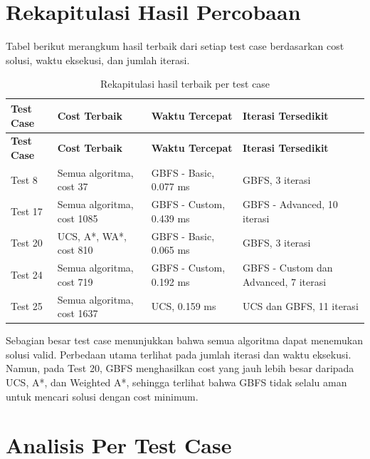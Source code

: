 \section{Rekapitulasi Hasil Percobaan}

Tabel berikut merangkum hasil terbaik dari setiap test case berdasarkan cost solusi, waktu eksekusi, dan jumlah iterasi.

\begin{longtable}{|p{2cm}|p{3.2cm}|p{3.2cm}|p{3.2cm}|}
	\caption{Rekapitulasi hasil terbaik per test case} \\
	\hline
	\rowcolor{green!15}
	\textbf{Test Case} & \textbf{Cost Terbaik} & \textbf{Waktu Tercepat} & \textbf{Iterasi Tersedikit} \\
	\hline
	\endfirsthead
	
	\hline
	\rowcolor{green!15}
	\textbf{Test Case} & \textbf{Cost Terbaik} & \textbf{Waktu Tercepat} & \textbf{Iterasi Tersedikit} \\
	\hline
	\endhead
	
	Test 8 & Semua algoritma, cost 37 & GBFS - Basic, 0.077 ms & GBFS, 3 iterasi \\
	\hline
	Test 17 & Semua algoritma, cost 1085 & GBFS - Custom, 0.439 ms & GBFS - Advanced, 10 iterasi \\
	\hline
	Test 20 & UCS, A*, WA*, cost 810 & GBFS - Basic, 0.065 ms & GBFS, 3 iterasi \\
	\hline
	Test 24 & Semua algoritma, cost 719 & GBFS - Custom, 0.192 ms & GBFS - Custom dan Advanced, 7 iterasi \\
	\hline
	Test 25 & Semua algoritma, cost 1637 & UCS, 0.159 ms & UCS dan GBFS, 11 iterasi \\
	\hline
\end{longtable}

\begin{tcolorbox}[
	colback=green!5,
	colframe=green!50!black,
	title=\textbf{Gambaran Umum Hasil},
	arc=2mm,
	boxrule=0.8pt
]
Sebagian besar test case menunjukkan bahwa semua algoritma dapat menemukan solusi valid. 
Perbedaan utama terlihat pada jumlah iterasi dan waktu eksekusi. 
Namun, pada Test 20, GBFS menghasilkan cost yang jauh lebih besar daripada UCS, A*, dan Weighted A*, sehingga terlihat bahwa GBFS tidak selalu aman untuk mencari solusi dengan cost minimum.
\end{tcolorbox}


\section{Analisis Per Test Case}


